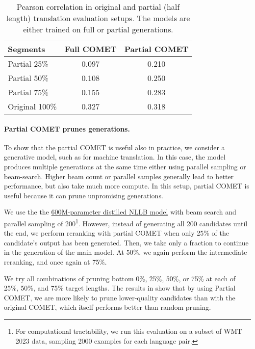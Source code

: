 \begin{table}[ht]
\small
\centering
\begin{tabular}{lcc}
\toprule
\bf Segments & \bf Full COMET & \bf Partial COMET \\
\midrule
Partial 25\% & 0.097 & 0.210 \\
Partial 50\% & 0.108 & 0.250 \\
Partial 75\% & 0.155 & 0.283 \\
Original 100\% & 0.327 & 0.318 \\
\bottomrule
\end{tabular}

\caption{Pearson correlation in original and partial (half length) translation evaluation setups. The models are either trained on full or partial generations.}
\label{tab:results_partial}
\end{table}


\paragraph{Partial COMET prunes generations.}

To show that the partial COMET is useful also in practice, we consider a generative model, such as for machine translation.
In this case, the model produces multiple generations at the same time either using parallel sampling or beam-search.
Higher beam count or parallel samples generally lead to better performance, but also take much more compute.
In this setup, partial COMET is useful because it can prune unpromising generations.

We use the the \href{https://huggingface.co/facebook/nllb-200-distilled-600M}{600M-parameter distilled NLLB model} \citep{nllb2022} with beam search and parallel sampling of 200\footnote{For computational tractability, we  run this evaluation on a subset of WMT 2023 data, sampling 2000 examples for each language pair.}.
However, instead of generating all 200 candidates until the end, we perform reranking with partial COMET when only 25\% of the candidate's output has been generated.
Then, we take only a fraction to continue in the generation of the main model.
At 50\%, we again perform the intermediate reranking, and once again at 75\%.


We try all combinations of pruning bottom 0\%, 25\%, 50\%, or 75\% at each of 25\%, 50\%, and 75\% target lengths.
The results in  show that by using Partial COMET, we are more likely to prune lower-quality candidates than with the original COMET, which itself performs better than random pruning.

